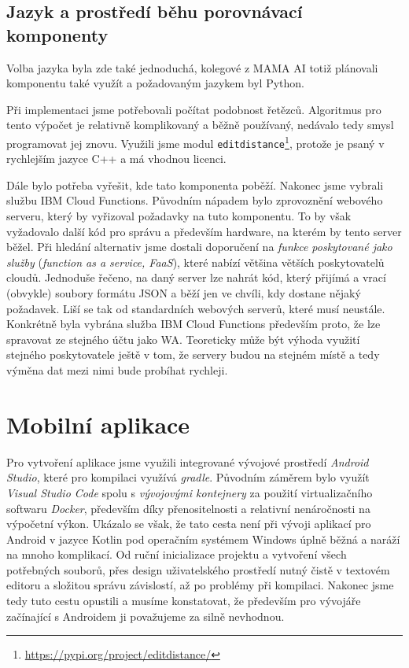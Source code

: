 \subsection{Jazyk a prostředí běhu porovnávací komponenty}

Volba jazyka byla zde také jednoduchá, kolegové z MAMA AI totiž plánovali
komponentu také využít a požadovaným jazykem byl Python.

Při implementaci jsme potřebovali počítat podobnost řetězců. Algoritmus
pro tento výpočet je relativně komplikovaný a běžně používaný, nedávalo tedy
smysl programovat jej znovu. Využili jsme modul
\texttt{editdistance}\footnote{\url{https://pypi.org/project/editdistance/}},
protože je psaný v rychlejším jazyce C++ a má vhodnou licenci.

Dále bylo potřeba vyřešit, kde tato komponenta poběží. Nakonec jsme vybrali
službu IBM Cloud Functions. Původním nápadem bylo
zprovoznění webového serveru, který by vyřizoval požadavky na tuto komponentu.
To by však vyžadovalo další kód pro správu a především hardware, na kterém by
tento server běžel. Při hledání alternativ jsme dostali doporučení na
\textit{funkce poskytované jako služby} (\textit{function as a service, FaaS}),
které nabízí většina větších poskytovatelů cloudů. Jednoduše řečeno, na daný
server lze nahrát kód, který přijímá a vrací (obvykle) soubory formátu JSON a
běží jen ve chvíli, kdy dostane nějaký požadavek. Liší se tak od standardních
webových serverů, které musí  neustále. Konkrétně byla vybrána
služba IBM Cloud Functions především proto, že lze spravovat ze stejného účtu jako
WA. Teoreticky může být výhoda využití stejného poskytovatele ještě v tom, že
servery budou na stejném místě a tedy výměna dat mezi nimi bude probíhat rychleji.

\section{Mobilní aplikace}\label{app}

Pro vytvoření aplikace jsme využili integrované vývojové prostředí
\textit{Android Studio}, které pro kompilaci využívá \textit{gradle}.
Původním záměrem bylo využít \textit{Visual Studio Code}
spolu s \textit{vývojovými kontejnery} za použití virtualizačního softwaru
\textit{Docker}, především díky přenositelnosti a relativní nenáročnosti
na výpočetní výkon. Ukázalo se však, že tato cesta není při vývoji aplikací
pro Android v jazyce Kotlin pod operačním systémem Windows úplně běžná a
naráží na mnoho komplikací. Od ruční inicializace projektu a vytvoření všech
potřebných souborů, přes design uživatelského
prostředí nutný čistě v textovém editoru a složitou správu závislostí,
až po problémy při kompilaci. Nakonec jsme tedy tuto cestu opustili a
musíme konstatovat, že především pro vývojáře začínající s Androidem
ji považujeme za silně nevhodnou.

